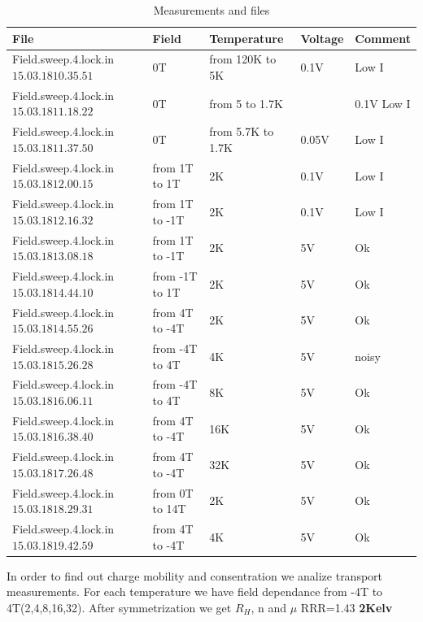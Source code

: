 \documentclass[idxtotoc,hyperref,openany,oneside]{labbook} %
\begin{document}
 \begin{table}[H]
\begin{tabular}{l l l l l}
\toprule
\textbf{File} & \textbf{Field} & \textbf{Temperature}& \textbf{Voltage}& \textbf{Comment}\\
\toprule
Field.sweep.4.lock.in$15.03.18 10.35.51 $& 0T  & from 120K to 5K & 0.1V& Low I\\
Field.sweep.4.lock.in$15.03.18  11.18.22$& 0T  & from 5 to 1.7K&& 0.1V Low I\\
Field.sweep.4.lock.in$15.03.18  11.37.50$& 0T  & from 5.7K to 1.7K & 0.05V&Low I\\
Field.sweep.4.lock.in$15.03.18  12.00.15$& from 1T to 1T  & 2K & 0.1V & Low I\\
Field.sweep.4.lock.in$15.03.18  12.16.32$& from 1T to -1T  & 2K & 0.1V& Low I\\
Field.sweep.4.lock.in$15.03.18  13.08.18$& from 1T to -1T  & 2K & 5V& Ok\\
Field.sweep.4.lock.in$15.03.18  14.44.10$& from -1T to 1T  & 2K &5V & Ok\\
Field.sweep.4.lock.in$15.03.18  14.55.26$& from 4T to -4T  & 2K &5V & Ok\\
Field.sweep.4.lock.in$15.03.18  15.26.28$& from -4T to 4T  & 4K &5V & noisy\\
Field.sweep.4.lock.in$15.03.18  16.06.11$& from -4T to 4T  & 8K &5V & Ok\\
Field.sweep.4.lock.in$15.03.18  16.38.40$& from 4T to -4T  & 16K &5V & Ok\\
Field.sweep.4.lock.in$15.03.18  17.26.48$& from 4T to -4T  & 32K &5V & Ok\\
Field.sweep.4.lock.in$15.03.18  18.29.31$& from 0T to 14T  & 2K &5V & Ok\\
Field.sweep.4.lock.in$15.03.18  19.42.59$& from 4T to -4T  & 4K &5V & Ok\\


\bottomrule
\end{tabular}
\caption{Measurements and files}
\label{tab:Measurements and files}
\end{table}
In order to find out charge mobility and consentration we analize transport measurements.
For each temperature we have field dependance from -4T to 4T(2,4,8,16,32). After symmetrization we get $R_H$, n and $ \mu$
\newline
RRR=1.43
\newline
\normalsize \textbf{2Kelv}\\
\end{document}
